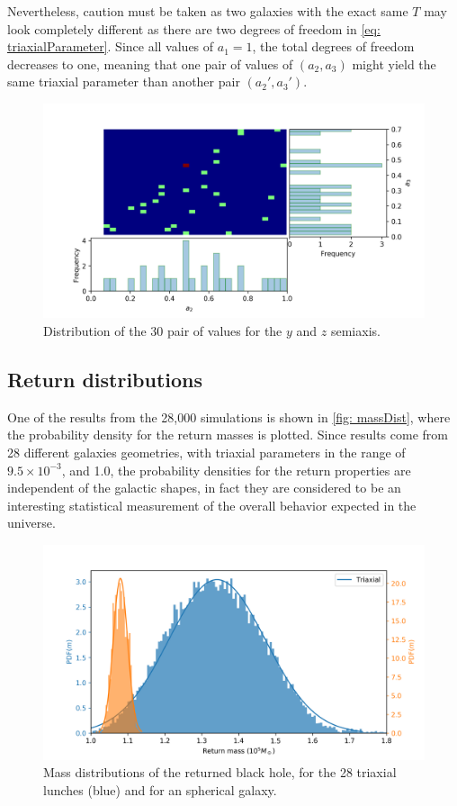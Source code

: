 	Nevertheless, caution must be taken as two galaxies with the exact same $T$ may look completely different as there are two degrees of freedom in \autoref{eq: triaxialParameter}. Since all values of $a_1 = 1$, the total degrees of freedom decreases to one, meaning that one pair of values of $(a_2, a_3)$ might yield the same triaxial parameter than another pair $(a_2', a_3')$.
	
	\begin{figure}[h]
		\centering
		\includegraphics[width = 0.9\linewidth]{"../Files/Week 13/triaxial_axes"}
		\caption{Distribution of the 30 pair of values for the $y$ and $z$ semiaxis.}
		\label{fig: semiaxisDist}
	\end{figure}

	\subsection{Return distributions}
	One of the results from the 28,000 simulations is shown in \autoref{fig: massDist}, where the probability density for the return masses is plotted. Since results come from 28 different galaxies geometries, with triaxial parameters in the range of $9.5\times10^{-3}$, and 1.0, the probability densities for the return properties are independent of the galactic shapes, in fact they are considered to be an interesting statistical measurement of the overall behavior expected in the universe.
	\begin{figure}[h]
		\centering
		\includegraphics[width=0.7\linewidth]{"../Files/Week 14/dist_masses"}
		\caption{Mass distributions of the returned black hole, for the 28 triaxial lunches (blue) and for an spherical galaxy.}
		\label{fig: massDist}
	\end{figure}


